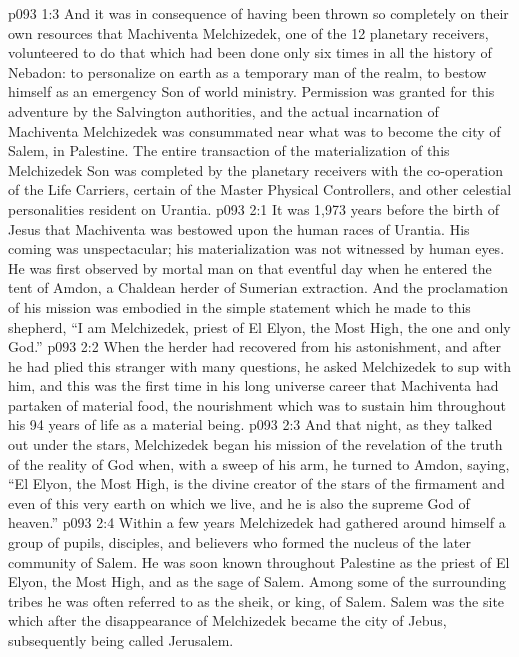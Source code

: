 \vs p093 1:3 And it was in consequence of having been thrown so completely on their own resources that Machiventa Melchizedek, one of the 12 planetary receivers, volunteered to do that which had been done only six times in all the history of Nebadon: to personalize on earth as a temporary man of the realm, to bestow himself as an emergency Son of world ministry. Permission was granted for this adventure by the Salvington authorities, and the actual incarnation of Machiventa Melchizedek was consummated near what was to become the city of Salem, in Palestine. The entire transaction of the materialization of this Melchizedek Son was completed by the planetary receivers with the co\hyp{}operation of the Life Carriers, certain of the Master Physical Controllers, and other celestial personalities resident on Urantia.
\vs p093 2:1 It was 1,973 years before the birth of Jesus that Machiventa was bestowed upon the human races of Urantia. His coming was unspectacular; his materialization was not witnessed by human eyes. He was first observed by mortal man on that eventful day when he entered the tent of Amdon, a Chaldean herder of Sumerian extraction. And the proclamation of his mission was embodied in the simple statement which he made to this shepherd, “I am Melchizedek, priest of El Elyon, the Most High, the one and only God.”
\vs p093 2:2 When the herder had recovered from his astonishment, and after he had plied this stranger with many questions, he asked Melchizedek to sup with him, and this was the first time in his long universe career that Machiventa had partaken of material food, the nourishment which was to sustain him throughout his 94 years of life as a material being.
\vs p093 2:3 And that night, as they talked out under the stars, Melchizedek began his mission of the revelation of the truth of the reality of God when, with a sweep of his arm, he turned to Amdon, saying, “El Elyon, the Most High, is the divine creator of the stars of the firmament and even of this very earth on which we live, and he is also the supreme God of heaven.”
\vs p093 2:4 \pc Within a few years Melchizedek had gathered around himself a group of pupils, disciples, and believers who formed the nucleus of the later community of Salem. He was soon known throughout Palestine as the priest of El Elyon, the Most High, and as the sage of Salem. Among some of the surrounding tribes he was often referred to as the sheik, or king, of Salem. Salem was the site which after the disappearance of Melchizedek became the city of Jebus, subsequently being called Jerusalem.
